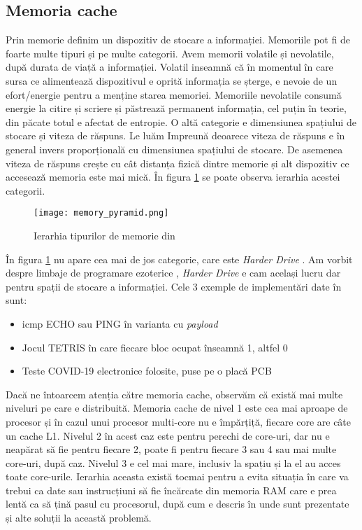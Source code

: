 \documentclass[../main.tex]{subfiles}
\begin{document}
\subsection{Memoria cache}
Prin memorie definim un dispozitiv de stocare a informației. Memoriile pot fi de foarte multe tipuri și pe multe categorii.
Avem memorii volatile și nevolatile, după durata de viață a informației. Volatil inseamnă că în momentul în care sursa
ce alimentează dispozitivul e oprită informația se șterge, e nevoie de un efort/energie pentru a menține starea memoriei.
Memoriile nevolatile consumă energie la citire și scriere și păstrează permanent informația, cel puțin în teorie, din păcate
totul e afectat de entropie. O altă categorie e dimensiunea spațiului de stocare și viteza de răspuns. Le luăm Impreună
deoarece viteza de răspuns e în general invers proporțională cu dimensiunea spațiului de stocare. De asemenea viteza de
răspuns crește cu cât distanța fizică dintre memorie și alt dispozitiv ce accesează memoria este mai mică. În figura
\ref{fig:memory_pyramid} se poate observa ierarhia acestei categorii.

\begin{figure}[h]
    \centering
    \texttt{[image: memory\_pyramid.png]}
    \caption{Ierarhia tipurilor de memorie din \cite{memoryhierarchy}}
    \label{fig:memory_pyramid}
\end{figure}

În figura \ref{fig:memory_pyramid} nu apare cea mai de jos categorie, care este \emph{Harder Drive} \cite{harderdrive}. 
Am vorbit despre limbaje de programare ezoterice \cite{esolangs}, \emph{Harder Drive} \cite{harderdrive} e cam același 
lucru dar pentru spații de stocare a informației. Cele 3 exemple de implementări date în \cite{harderdrive} sunt:
\begin{itemize}
    \item \acrshort{icmp} ECHO sau PING în varianta cu \emph{payload}
    \item Jocul TETRIS în care fiecare bloc ocupat înseamnă 1, altfel 0
    \item Teste COVID-19 electronice folosite, puse pe o placă PCB
\end{itemize}

Dacă ne întoarcem atenția către memoria cache, observăm că există mai multe niveluri pe care e distribuită. Memoria cache
de nivel 1 este cea mai aproape de procesor și în cazul unui procesor multi-core nu e împărțiță, fiecare core are câte un
cache L1. Nivelul 2 în acest caz este pentru perechi de core-uri, dar nu e neapărat să fie pentru fiecare 2, poate fi pentru
fiecare 3 sau 4 sau mai multe core-uri, după caz. Nivelul 3 e cel mai mare, inclusiv la spațiu și la el au acces toate
core-urile. Ierarhia aceasta există tocmai pentru a evita situația în care va trebui ca date sau instrucțiuni să fie încărcate
din memoria RAM care e prea lentă ca să țină pasul cu procesorul, după cum e descris în \cite{bottleneck} unde sunt prezentate 
și alte soluții la această problemă.
\end{document}
